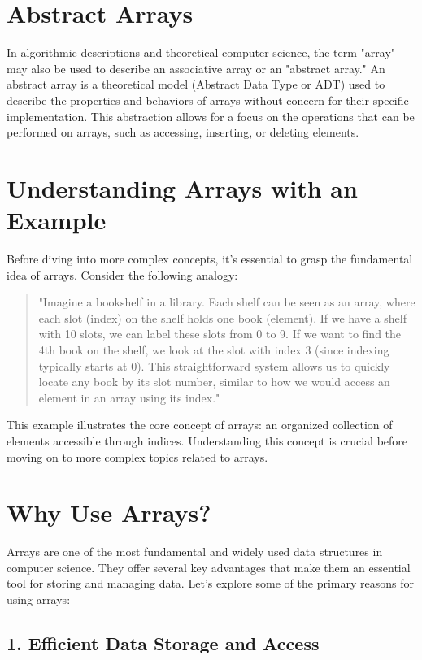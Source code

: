 \documentclass{book}
\begin{document}
	\section{Abstract Arrays}
	
	In algorithmic descriptions and theoretical computer science, the term "array" may also be used to describe an associative array or an "abstract array." An abstract array is a theoretical model (Abstract Data Type or ADT) used to describe the properties and behaviors of arrays without concern for their specific implementation. This abstraction allows for a focus on the operations that can be performed on arrays, such as accessing, inserting, or deleting elements.
	
	\section{Understanding Arrays with an Example}
	
	Before diving into more complex concepts, it's essential to grasp the fundamental idea of arrays. Consider the following analogy:
	
	\begin{quote}
		"Imagine a bookshelf in a library. Each shelf can be seen as an array, where each slot (index) on the shelf holds one book (element). If we have a shelf with 10 slots, we can label these slots from 0 to 9. If we want to find the 4th book on the shelf, we look at the slot with index 3 (since indexing typically starts at 0). This straightforward system allows us to quickly locate any book by its slot number, similar to how we would access an element in an array using its index."
	\end{quote}
	
	This example illustrates the core concept of arrays: an organized collection of elements accessible through indices. Understanding this concept is crucial before moving on to more complex topics related to arrays.
	
	\section{Why Use Arrays?}
	
	Arrays are one of the most fundamental and widely used data structures in computer science. They offer several key advantages that make them an essential tool for storing and managing data. Let's explore some of the primary reasons for using arrays:
	
	\subsection{1. Efficient Data Storage and Access}
	
\end{document}
